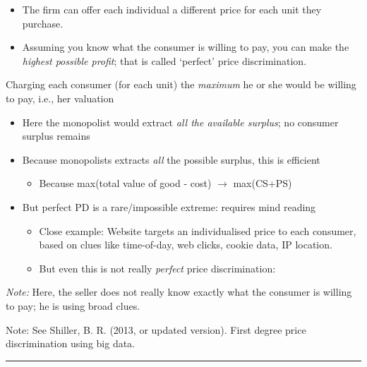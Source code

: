 \documentclass[]{article}
\providecommand{\tightlist}{%
  \setlength{\itemsep}{0pt}\setlength{\parskip}{0pt}}
\begin{document}
\begin{itemize}
\item
  The firm can offer each individual a different price for each unit
  they purchase.
\item
  Assuming you know what the consumer is willing to pay, you can make
  the \emph{highest possible profit}; that is called `perfect' price
  discrimination.
\end{itemize}

\bigskip

\begin{description}
\tightlist
\item[Perfect price discrimination]
Charging each consumer (for each unit) the \emph{maximum} he or she
would be willing to pay, i.e., her valuation
\end{description}

\bigskip

\begin{itemize}
\tightlist
\item
  Here the monopolist would extract \emph{all the available surplus}; no
  consumer surplus remains
\item
  Because monopolists extracts \emph{all} the possible surplus, this is
  efficient

  \begin{itemize}
  \tightlist
  \item
    Because max(total value of good - cost) \(\rightarrow\) max(CS+PS)
  \end{itemize}
\item
  But perfect PD is a rare/impossible extreme: requires mind reading

  \begin{itemize}
  \tightlist
  \item
    Close example: Website targets an individualised price to each
    consumer, based on clues like time-of-day, web clicks, cookie data,
    IP location.
  \item
    But even this is not really \emph{perfect} price discrimination:
  \end{itemize}
\end{itemize}

\emph{Note:} Here, the seller does not really know exactly what the
consumer is willing to pay; he is using broad clues.

Note: See Shiller, B. R. (2013, or updated version). First degree price
discrimination using big data.

\begin{center}\rule{0.5\linewidth}{\linethickness}\end{center}
\end{document}
